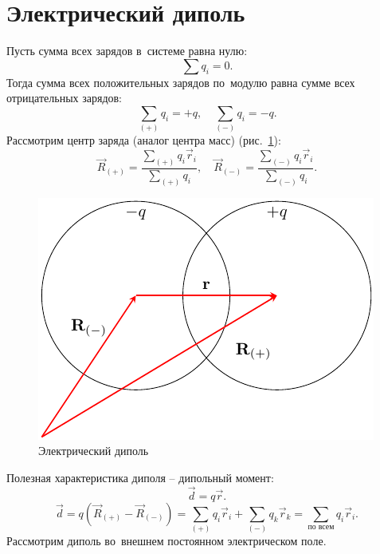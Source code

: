 \section{Электрический диполь}

	Пусть сумма всех зарядов в~системе равна нулю:
		$$\sum q_i = 0.$$
	Тогда сумма всех положительных зарядов по~модулю равна сумме всех отрицательных зарядов:
		$$\sum_{(+)} q_i = +q, \quad \sum_{(-)} q_i = -q.$$
	Рассмотрим центр заряда (аналог центра масс) (рис.~\ref{fig:dipole1}):
		$$\vec{R}_{(+)}=\frac{\sum_{(+)} q_i\vec{r}_i}{\sum_{(+)} q_i}, \quad \vec{R}_{(-)}=\frac{\sum_{(-)} q_i\vec{r}_i}{\sum_{(-)} q_i}.$$
	\begin{figure}[h!]
		\label{fig:dipole1}
		\centering
		\includegraphics[scale=1.25]{./img/dipole1/dipole1.pdf}
		\caption{Электрический диполь}
	\end{figure}
	Полезная характеристика диполя -- дипольный момент:
	\begin{equation}
		\vec{d}=q\vec{r}.
	\end{equation}
	\begin{equation}
		\vec{d}=q(\vec{R}_{(+)}-\vec{R}_{(-)})=\sum_{(+)} q_i\vec{r}_i + \sum_{(-)} q_k\vec{r}_k=\sum_{\text{по всем}} q_i\vec{r}_i.
	\end{equation}
	Рассмотрим диполь во~внешнем постоянном электрическом поле.
